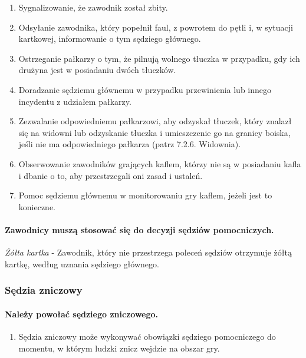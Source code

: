 \documentclass[12pt]{article}
\begin{document}
\begin{enumerate}
\item Sygnalizowanie, że zawodnik został zbity.

\item Odsyłanie zawodnika, który popełnił faul, z powrotem do pętli i, w
sytuacji kartkowej, informowanie o tym sędziego głównego.

\item Ostrzeganie pałkarzy o tym, że pilnują wolnego tłuczka w przypadku,
gdy ich drużyna jest w posiadaniu dwóch tłuczków.

\item Doradzanie sędziemu głównemu w przypadku przewinienia lub innego
incydentu z udziałem pałkarzy.

\item Zezwalanie odpowiedniemu pałkarzowi, aby odzyskał tłuczek, który
znalazł się na widowni lub odzyskanie tłuczka i umieszczenie go na
granicy boiska, jeśli nie ma odpowiedniego pałkarza (patrz 7.2.6.
Widownia).

\item Obserwowanie zawodników grających kaflem, którzy nie są w posiadaniu
kafla i dbanie o to, aby przestrzegali oni zasad i ustaleń.

\item Pomoc sędziemu głównemu w monitorowaniu gry kaflem, jeżeli jest to
konieczne.
\end{enumerate}

\paragraph{Zawodnicy muszą stosować się do decyzji sędziów
pomocniczych.}

\emph{Żółta kartka} - Zawodnik, który nie przestrzega poleceń sędziów
otrzymuje żółtą kartkę, według uznania sędziego głównego.

\subsubsection{Sędzia zniczowy}

\paragraph{Należy powołać sędziego zniczowego.}

\begin{enumerate}
\item
    Sędzia zniczowy może wykonywać obowiązki sędziego pomocniczego do
  momentu, w którym ludzki znicz wejdzie na obszar gry.
  \end{enumerate}
\end{document}
